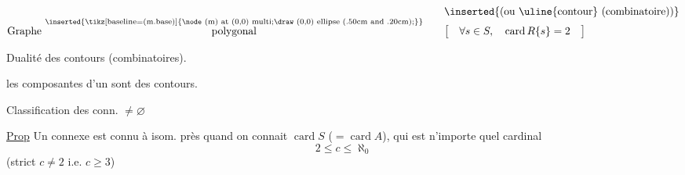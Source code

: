 \reversemarginpar
{}
\normalmarginpar
\[
\begin{array}{@{}l@{\qquad}l@{}}
&\inserted{\text{(ou \uline{contour} (combinatoire))}}\\[-.3ex]
\text{Graphe }\overset{\text{\inserted{\tikz[baseline=(m.base)]{\node (m) at (0,0) {multi};\draw (0,0) ellipse (.50cm and .20cm);}}}}{\text{polygonal}}
&\bigl[\quad\forall s\in S,\quad\operatorname{card}R\{s\}=2\quad\bigr]
\end{array}
\]

Dualité des  contours (combinatoires).

 les composantes  d'un  sont  des contours.

Classification des  conn. $\ne\varnothing$

\uline{Prop} Un  connexe \inserted{$\ne\varnothing$} est connu à isom. près quand on connait $\operatorname{card}S$ ($=\operatorname{card}A$), qui est n'importe quel cardinal 
\[
2\le c\le\aleph_{0}
\]
(strict  $c\ne2$ i.e. $c\geqslant3$)
